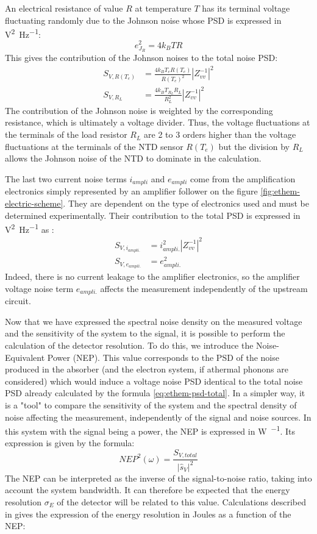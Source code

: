An electrical resistance of value $R$ at temperature $T$ has its terminal voltage fluctuating randomly due to the Johnson noise whose PSD is expressed in \si{\volt^2\per\Hz}:
\begin{equation}
e_{J_R}^2 = 4k_B T R
\end{equation}
This gives the contribution of the Johnson noises to the total noise PSD:
\begin{align}
S_{V,R(T_e)} &= \frac{4 k_B T_e R(T_e)}{R(T_e)^2} \left\vert Z_{vv}^{-1}\right\vert^2
\\
S_{V,R_L} &= \frac{4 k_B T_{R_L} R_L}{R_L^2} \left\vert Z_{vv}^{-1}\right\vert^2
\end{align}
The contribution of the Johnson noise is weighted by the corresponding resistance, which is ultimately a voltage divider. Thus, the voltage fluctuations at the terminals of the load resistor $R_L$ are 2 to 3 orders higher than the voltage fluctuations at the terminals of the NTD sensor $R(T_e)$ but the division by $R_L$ allows the Johnson noise of the NTD to dominate in the calculation.

The last two current noise terms $i_{ampli}$ and $e_{ampli}$ come from the amplification electronics simply represented by an amplifier follower on the figure \ref{fig:ethem-electric-scheme}. They are dependent on the type of electronics used and must be determined experimentally. Their contribution to the total PSD is expressed in \si{\volt^2\per\Hz} as :
\begin{align}
\label{eq:ethem-noise-ampli}
S_{V,i_{ampli.}} &= i_{ampli.}^2 \left\vert Z_{vv}^{-1}\right\vert^2
\\
S_{V,e_{ampli.}} &= e_{ampli.}^2
\end{align}
Indeed, there is no current leakage to the amplifier electronics, so the amplifier voltage noise term $e_{ampli.}$ affects the measurement independently of the upstream circuit.

Now that we have expressed the spectral noise density on the measured voltage and the sensitivity of the system to the signal, it is possible to perform the calculation of the detector resolution. To do this, we introduce the Noise-Equivalent Power (NEP). This value corresponds to the PSD of the noise produced in the absorber (and the electron system, if athermal phonons are considered) which would induce a voltage noise PSD identical to the total noise PSD already calculated by the formula \ref{eq:ethem-psd-total}. In a simpler way, it is a "tool" to compare the sensitivity of the system and the spectral density of noise affecting the measurement, independently of the signal and noise sources. In this system with the signal being a power, the NEP is expressed in \si{\watt\per\sqrthz}. Its expression is given by the formula:
\begin{equation}
\label{eq:nep}
NEP^2(\omega) =  \frac{S_{V,total}}{|\hat{s}_V|^2}
\end{equation}
The NEP can be interpreted as the inverse of the signal-to-noise ratio, taking into account the system bandwidth. It can therefore be expected that the energy resolution $\sigma_E$ of the detector will be related to this value. Calculations described in \cite{Enss:2005md} gives the expression of the energy resolution in Joules as a function of the NEP:

